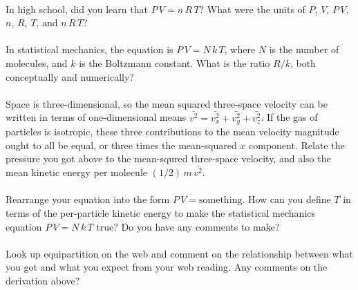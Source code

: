 \documentclass[12pt]{article}
\begin{document}
\paragraph{\theproblem}%
In high school, did you learn that $P\,V = n\,R\,T$? What were the
units of $P$, $V$, $P\,V$, $n$, $R$, $T$, and $n\,R\,T$?

\paragraph{\theproblem}%
In statistical mechanics, the equation is $P\,V = N\,k\,T$, where $N$
is the number of molecules, and $k$ is the Boltzmann constant. What is
the ratio $R/k$, both conceptually and numerically?

\paragraph{\theproblem}%
Space is three-dimensional, so the mean squared three-space
velocity can be written in terms of one-dimensional means $\bar{v^2} =
\bar{v_x^2} + \bar{v_y^2} + \bar{v_z^2}$. If the gas of particles is
isotropic, these three contributions to the mean velocity magnitude
ought to all be equal, or three times the mean-squared $x$ component.
Relate the pressure you got above to the mean-squred three-space velocity,
and also the mean kinetic energy per molecule $(1/2)\,m\,\bar{v^2}$.

\paragraph{\theproblem}%
Rearrange your equation into the form $P\,V=\mbox{something}$. How can
you define $T$ in terms of the per-particle kinetic energy to make the
statistical mechanics equation $P\,V = N\,k\,T$ true? Do you have any
comments to make?

\paragraph{\theproblem}%
Look up equipartition on the web and comment on the relationship
between what you got and what you expect from your web reading. Any
comments on the derivation above?
\end{document}
